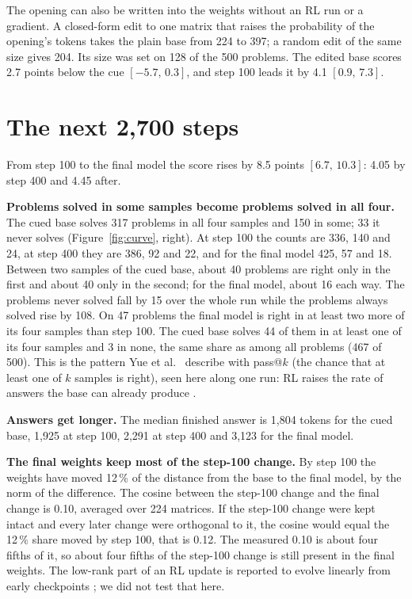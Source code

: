 \documentclass[10pt]{article}
\newcommand{\ci}[2]{$[#1,\,#2]$}
\begin{document}
The opening can also be written into the weights without an RL run or a gradient. A closed-form edit to one
matrix that raises the probability of the opening's tokens takes the plain base from 224 to 397; a random edit of
the same size gives 204. Its size was set on 128 of the 500 problems. The edited base scores 2.7 points below the cue
\ci{-5.7}{0.3}, and step 100 leads it by 4.1 \ci{0.9}{7.3}.

\section{The next 2{,}700 steps}

From step 100 to the final model the score rises by 8.5 points \ci{6.7}{10.3}: 4.05 by step 400 and 4.45 after.

\textbf{Problems solved in some samples become problems solved in all four.} The cued base solves 317 problems in all four samples and 150 in
some; 33 it never solves (Figure~\ref{fig:curve}, right). At step 100 the counts are 336, 140 and 24, at step
400 they are 386, 92 and 22, and for the final model 425, 57 and 18. Between two samples of the cued base, about
40 problems are right only in the first and about 40 only in the second; for the final model, about 16 each way.
The problems never solved fall by 15 over the whole run while the problems always solved rise by 108. On 47
problems the final model is right in at least two more of its four samples than step 100. The cued base solves 44
of them in at least one of its four samples and 3 in none, the same share as among all problems (467 of 500). This
is the pattern Yue et al.\ \cite{yue2025does} describe with pass@$k$ (the chance that at least one of $k$ samples is right),
seen here along one run: RL raises the rate of answers the base can already produce
\cite{zhao2025echo,shao2025spurious}.

\textbf{Answers get longer.} The median finished answer is 1{,}804 tokens for the cued base, 1{,}925 at step
100, 2{,}291 at step 400 and 3{,}123 for the final model.

\textbf{The final weights keep most of the step-100 change.} By step 100 the weights have moved 12\,\% of the distance from the base
to the final model, by the norm of the difference. The cosine between the step-100 change and the final change is
0.10, averaged over 224 matrices. If the step-100 change were kept intact and every later change were
orthogonal to it, the cosine would equal the 12\,\% share moved by step 100, that is 0.12. The measured 0.10 is about four fifths of it, so
about four fifths of the step-100 change is still present in the final weights. The low-rank
part of an RL update is reported to evolve linearly from early checkpoints
\cite{cai2025predictability,wang2026linear}; we did not test that here.
\end{document}
